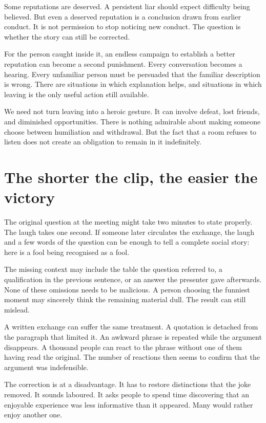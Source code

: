 \documentclass[12pt,a4paper]{book}
\begin{document}
Some reputations are deserved. A persistent liar should expect difficulty being believed. But even a deserved reputation is a conclusion drawn from earlier conduct. It is not permission to stop noticing new conduct. The question is whether the story can still be corrected.

For the person caught inside it, an endless campaign to establish a better reputation can become a second punishment. Every conversation becomes a hearing. Every unfamiliar person must be persuaded that the familiar description is wrong. There are situations in which explanation helps, and situations in which leaving is the only useful action still available.

We need not turn leaving into a heroic gesture. It can involve defeat, lost friends, and diminished opportunities. There is nothing admirable about making someone choose between humiliation and withdrawal. But the fact that a room refuses to listen does not create an obligation to remain in it indefinitely.

\section*{The shorter the clip, the easier the victory}

The original question at the meeting might take two minutes to state properly. The laugh takes one second. If someone later circulates the exchange, the laugh and a few words of the question can be enough to tell a complete social story: here is a fool being recognised as a fool.

The missing context may include the table the question referred to, a qualification in the previous sentence, or an answer the presenter gave afterwards. None of these omissions needs to be malicious. A person choosing the funniest moment may sincerely think the remaining material dull. The result can still mislead.

A written exchange can suffer the same treatment. A quotation is detached from the paragraph that limited it. An awkward phrase is repeated while the argument disappears. A thousand people can react to the phrase without one of them having read the original. The number of reactions then seems to confirm that the argument was indefensible.

The correction is at a disadvantage. It has to restore distinctions that the joke removed. It sounds laboured. It asks people to spend time discovering that an enjoyable experience was less informative than it appeared. Many would rather enjoy another one.
\end{document}
